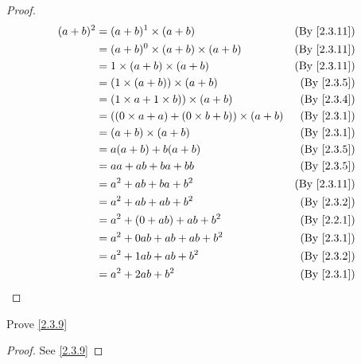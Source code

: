 \begin{proof}
  \begin{align*}
    (a + b)^2 & = (a + b)^1 \times (a + b)                             & \text{(By \cref{2.3.11})} \\
              & = (a + b)^0 \times (a + b) \times (a + b)              & \text{(By \cref{2.3.11})} \\
              & = 1 \times (a + b) \times (a + b)                      & \text{(By \cref{2.3.11})} \\
              & = (1 \times (a + b)) \times (a + b)                    & \text{(By \cref{2.3.5})}  \\
              & = (1 \times a + 1 \times b)) \times (a + b)            & \text{(By \cref{2.3.4})}  \\
              & = ((0 \times a + a) + (0 \times b + b)) \times (a + b) & \text{(By \cref{2.3.1})}  \\
              & = (a + b) \times (a + b)                               & \text{(By \cref{2.3.1})}  \\
              & = a(a + b) + b(a + b)                                  & \text{(By \cref{2.3.5})}  \\
              & = aa + ab + ba + bb                                    & \text{(By \cref{2.3.5})}  \\
              & = a^2 + ab + ba + b^2                                  & \text{(By \cref{2.3.11})} \\
              & = a^2 + ab + ab + b^2                                  & \text{(By \cref{2.3.2})}  \\
              & = a^2 + (0 + ab) + ab + b^2                            & \text{(By \cref{2.2.1})}  \\
              & = a^2 + 0ab + ab + ab + b^2                            & \text{(By \cref{2.3.1})}  \\
              & = a^2 + 1ab + ab + b^2                                 & \text{(By \cref{2.3.2})}  \\
              & = a^2 + 2ab + b^2                                      & \text{(By \cref{2.3.1})}  \\
  \end{align*}
\end{proof}

\begin{exercise}\label{ex 2.3.5}
  Prove \cref{2.3.9}
\end{exercise}

\begin{proof}
  See \cref{2.3.9}
\end{proof}